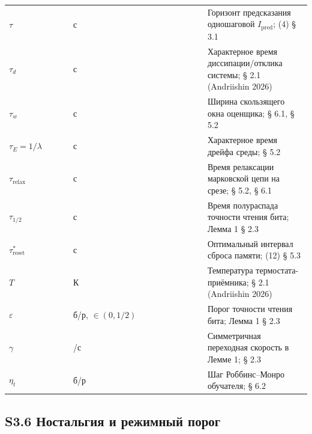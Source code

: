 \documentclass[pdflatex,sn-mathphys-ay]{sn-jnl}
\begin{document}
\begin{center}
\begin{tabular}{@{} >{\raggedright\arraybackslash}p{0.2105\linewidth} >{\raggedright\arraybackslash}p{0.4474\linewidth} >{\raggedright\arraybackslash}p{0.3421\linewidth}@{}}
\(\tau\) & с & Горизонт предсказания одношаговой \(I_{\text{pred}}\); (4) § 3.1 \\

\(\tau_d\) & с & Характерное время диссипации/отклика системы; § 2.1 (Andriishin 2026) \\

\(\tau_w\) & с & Ширина скользящего окна оценщика; § 6.1, § 5.2 \\

\(\tau_E = 1/\lambda\) & с & Характерное время дрейфа среды; § 5.2 \\

\(\tau_{\text{relax}}\) & с & Время релаксации марковской цепи на срезе; § 5.2, § 6.1 \\

\(\tau_{1/2}\) & с & Время полураспада точности чтения бита; Лемма 1 § 2.3 \\

\(\tau_{\text{reset}}^*\) & с & Оптимальный интервал сброса памяти; (12) § 5.3 \\

\(T\) & К & Температура термостата-приёмника; § 2.1 (Andriishin 2026) \\

\(\varepsilon\) & б/р, \(\in (0, 1/2)\) & Порог точности чтения бита; Лемма 1 § 2.3 \\

\(\gamma\) & 1/с & Симметричная переходная скорость в Лемме 1; § 2.3 \\

\(\eta_t\) & б/р & Шаг Роббинс--Монро обучателя; § 6.2 \\

\bottomrule
\end{tabular}
\end{center}


\subsection*{S3.6 Ностальгия и режимный порог}\label{s3.6-ux43dux43eux441ux442ux430ux43bux44cux433ux438ux44f-ux438-ux440ux435ux436ux438ux43cux43dux44bux439-ux43fux43eux440ux43eux433}
\end{document}
